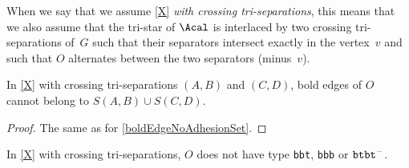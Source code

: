 \documentclass{aic}
\theoremstyle{plain}
\theoremstyle{definition}
\theoremstyle{plain}
\theoremstyle{plain}
\newcommand{\ty}[1]{{\tt#1}}
\begin{document}
When we say that we assume \autoref{X} \emph{with crossing tri-separations}, this means that we also assume that the tri-star of $\Acal$ is interlaced by two crossing tri-separations of~$G$ such that their separators intersect exactly in the vertex~$v$ and such that $O$ alternates between the two separators (minus~$v$).

\begin{obs}\label{noBoldEdgeObs}
    In \autoref{X} with crossing tri-separations $(A,B)$ and $(C,D)$, bold edges of $O$ cannot belong to $S(A,B)\cup S(C,D)$.
\end{obs}
\begin{proof}
    The same as for \autoref{boldEdgeNoAdhesionSet}.
\end{proof}

\begin{lem}\label{tiny-cases}
In \autoref{X} with crossing tri-separations, $O$ does not have type \ty{bbt}, \ty{bbb} or $\ty{btbt}^-$.
\end{lem}
\end{document}
